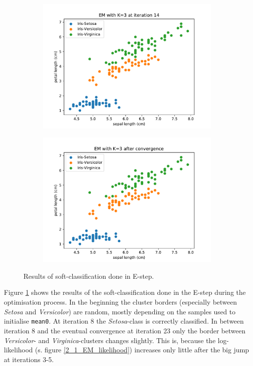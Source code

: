 \documentclass{article}
\begin{document}
\begin{figure}[!ht]
{\begin{subfigure}{0.6\textwidth}
	\includegraphics[width=\textwidth]{./Figures/2_1_EM_iter14}
	\end{subfigure}
	\begin{subfigure}{0.6\textwidth}
	\includegraphics[width=\textwidth]{./Figures/2_1_EM_converged}
	\end{subfigure}
	}	
	\caption{Results of soft-classification done in E-step.}
	\label{2_1_EM_iter}
\end{figure}

Figure \ref{2_1_EM_iter} shows the results of the soft-classification done in the E-step during the optimisation process. In the beginning the cluster borders (especially between \textit{Setosa} and \textit{Versicolor}) are random, mostly depending on the samples used to initialise \texttt{mean0}. At iteration 8 the \textit{Setosa}-class is correctly classified. In between iteration 8 and the eventual convergence at iteration 23 only the border between \textit{Versicolor}- and \textit{Virginica}-clusters changes slightly. This is, because the log-likelihood (s. figure \ref{2_1_EM_likelihood}) increases only little after the big jump at iterations 3-5.
\end{document}
